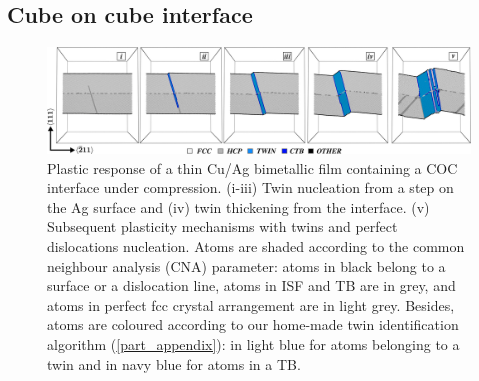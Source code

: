 \documentclass[final,3p,times,twocolumn]{elsarticle}
\begin{document}
 
	\subsection{Cube on cube interface}\label{subsubpart_sAg}

\begin{figure}[!t]
	\begin{center}
		\includegraphics[width=165mm]{Pic/fig_s1AgCOC.eps} 
	\end{center}
	\caption{Plastic response of a thin Cu/Ag bimetallic film containing a COC interface under compression. (i-iii) Twin nucleation from a step on the Ag surface and (iv) twin thickening from the interface. (v) Subsequent plasticity mechanisms with twins and perfect dislocations nucleation. Atoms are shaded according to the common neighbour analysis (CNA) parameter: atoms in black belong to a surface or a dislocation line, atoms in ISF and TB are in grey, and atoms in perfect fcc crystal arrangement are in light grey. Besides, atoms are coloured according to our home-made twin identification algorithm (\ref{part_appendix}): in light blue for atoms belonging to a twin and in navy blue for atoms in a TB.}\label{fig_s1AgCOC}
\end{figure}
\end{document}
